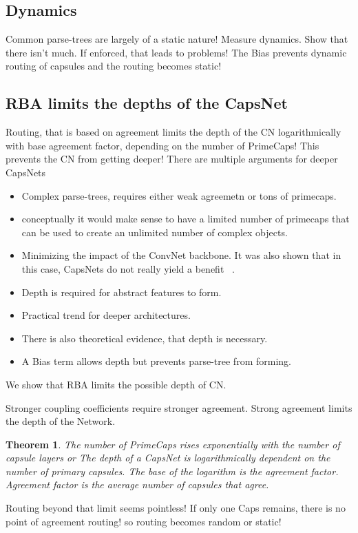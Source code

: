 \documentclass{article}
\newtheorem{theorem}{Theorem}
\begin{document}
\subsection*{Dynamics}
Common parse-trees are largely of a static nature!
Measure dynamics.
Show that there isn't much. 
If enforced, that leads to problems!
The Bias prevents dynamic routing of capsules and the routing becomes static!

\subsection*{RBA limits the depths of the CapsNet}
 
Routing, that is based on agreement limits the depth of the CN logarithmically with base agreement factor, depending on the number of PrimeCaps!
This prevents the CN from getting deeper!
There are multiple arguments for deeper CapsNets
\begin{itemize}
	\item Complex parse-trees, requires either weak agreemetn or tons of primecaps.
	\item conceptually it would make sense to have a limited number of primecaps that can be used to create an unlimited number of complex objects.
	\item Minimizing the impact of the ConvNet backbone. It was also shown that in this case, CapsNets do not really yield a benefit ~\cite{acml/PaikKK19}.
	\item Depth is required for abstract features to form.
	\item Practical trend for deeper architectures.
	\item There is also theoretical evidence, that depth is necessary.
	\item A Bias term allows depth but prevents parse-tree from forming.
\end{itemize}
We show that RBA limits the possible depth of CN.

Stronger coupling coefficients require stronger agreement. 
Strong agreement limits the depth of the Network.

\begin{theorem}
	The number of PrimeCaps rises exponentially with the number of capsule layers or
	The depth of a CapsNet is logarithmically dependent on the number of primary capsules.
	The base of the logarithm is the agreement factor.
	Agreement factor is the average number of capsules that agree.
\end{theorem}
Routing beyond that limit seems pointless!
If only one Caps remains, there is no point of agreement routing! so routing becomes random or static!
\end{document}
